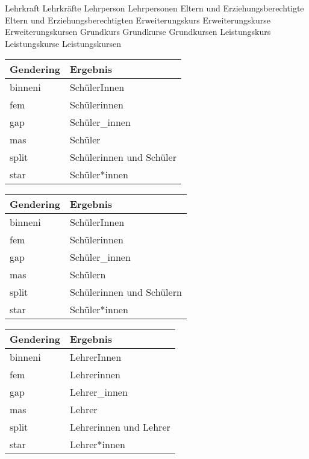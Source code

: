 \begin{multicols}{2}
\begin{commands}
	Lehr\-kraft
	Lehr\-kräf\-te
	Lehr\-per\-son
	Lehr\-per\-so\-nen
	El\-tern und Er\-zie\-hungs\-be\-recht\-ig\-te
	El\-tern und Er\-zie\-hungs\-be\-recht\-ig\-ten
	Er\-wei\-ter\-ungs\-kurs
	Er\-wei\-ter\-ungs\-kurse
	Er\-wei\-ter\-ungs\-kursen
	Grund\-kurs
	Grund\-kurse
	Grund\-kursen
	Leis\-tungs\-kurs
	Leis\-tungs\-kurse
	Leis\-tungs\-kursen
{\tiny 			\begin{tabular}{ll}
		\toprule \textbf{Gendering} & \textbf{Ergebnis} \\ 
		\midrule binneni & SchülerInnen \\ 
		fem & Schülerinnen \\ 
		gap & Schüler\_innen \\ 
		mas & Schüler \\ 
		split & Schülerinnen und Schüler \\ 
		star & Schüler*innen \\ 
		\bottomrule 
	\end{tabular} }
	{\tiny \begin{tabular}{ll}
		\toprule \textbf{Gendering} & \textbf{Ergebnis} \\ 
		\midrule binneni & SchülerInnen \\ 
		fem & Schülerinnen \\ 
		gap & Schüler\_innen \\ 
		mas & Schülern \\ 
		split & Schülerinnen und Schülern \\ 
		star & Schüler*innen \\ 
		\bottomrule 
	\end{tabular} }
	
	{\tiny \begin{tabular}{ll}
		\toprule \textbf{Gendering} & \textbf{Ergebnis} \\ 
		\midrule binneni & LehrerInnen \\ 
		fem & Lehrerinnen \\ 
		gap & Lehrer\_innen \\ 
		mas & Lehrer \\ 
		split & Lehrerinnen und Lehrer \\ 
		star & Lehrer*innen \\ 
		\bottomrule 
	\end{tabular} }
	

\end{commands}
\end{multicols}
